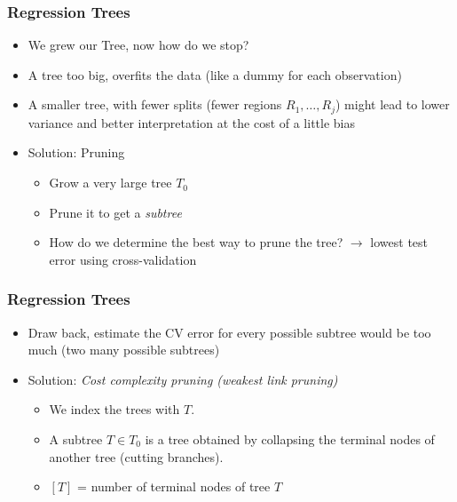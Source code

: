 \documentclass[
  shownotes,
  xcolor={svgnames},
  hyperref={colorlinks,citecolor=DarkBlue,linkcolor=DarkRed,urlcolor=DarkBlue}
  ]{beamer}
\begin{document}
\begin{frame}[fragile]
\frametitle{Regression Trees}
\begin{itemize}
\item We grew our Tree, now how do we stop?

\item A tree too big, overfits the data (like a dummy for each observation)
\item A smaller tree, with fewer splits (fewer regions $R_1,\dots,R_j$) might lead to lower variance and better interpretation at the cost of a little bias
\item Solution: Pruning
\begin{itemize}
 \item Grow a very large tree $T_0$
 \item Prune it to get a {\it subtree}
 \item How do we determine the best way to prune the tree? $\rightarrow$ lowest test error using cross-validation
\end{itemize}

\end{itemize}

\end{frame}
\begin{frame}[fragile]
\frametitle{Regression Trees}

\begin{itemize}
\item Draw back, estimate the CV error for every possible subtree would be too much (two many possible subtrees)
\item Solution: {\it Cost complexity pruning (weakest link pruning)}
\begin{itemize}
    \item We index the trees with $T$.
    \item A subtree $T \in T_0$ is a tree obtained by collapsing the terminal nodes of another tree (cutting branches).
    \item  $[T]$ = number of terminal nodes of tree $T$
\end{itemize}
\end{itemize}
\end{frame}
\end{document}
